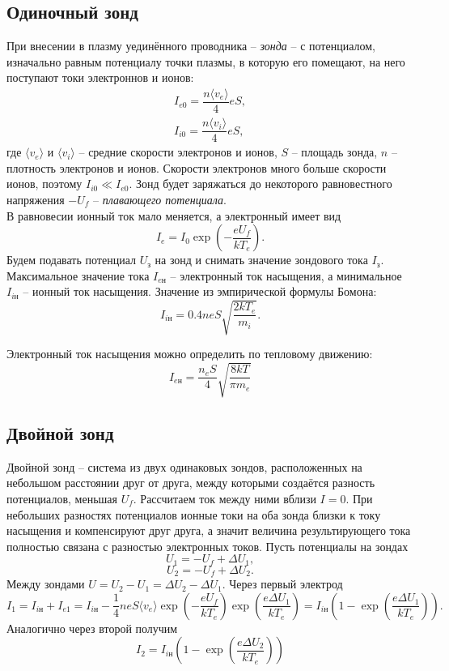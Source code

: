 \documentclass{lab}
\begin{document}
\subsection*{Одиночный зонд}
При внесении в плазму уединённого проводника -- \textit{зонда} -- с потенциалом, изначально равным потенциалу точки плазмы, в которую его помещают, на него поступают токи электроннов и ионов:
\begin{equation}
    \begin{array}{c}
        I_{e0} = \dfrac{n \langle v_e \rangle}{4}eS,\\
        I_{i0} = \dfrac{n \langle v_i \rangle}{4}eS,
    \end{array}
\end{equation}
где $\langle v_e \rangle$ и $\langle v_i \rangle$ -- средние скорости электронов и ионов, $S$ -- площадь зонда, $n$ -- плотность электронов и ионов. Скорости электронов много больше скорости ионов, поэтому $I_{i0} \ll I_{e0}$. Зонд будет заряжаться до некоторого равновестного напряжения $-U_f$ -- \textit{плавающего потенциала}.\\
В равновесии ионный ток мало меняется, а электронный имеет вид
$$
I_e = I_0 \exp\left( -\dfrac{eU_f}{kT_e} \right).
$$
Будем подавать потенциал $U_\text{з}$ на зонд и снимать значение зондового тока $I_\text{з}$. Максимальное значение тока $I_{e\text{н}}$ -- электронный ток насыщения, а минимальное $I_{i\text{н}}$ -- ионный ток насыщения. Значение из эмпирической формулы Бомона:
\begin{equation}
    I_{i\text{н}} = 0.4 neS \sqrt{\dfrac{2kT_e}{m_i}}.
\end{equation}

Электронный ток насыщения можно определить по тепловому движению:
\[I_{e\text{н}} = \frac{n_eS}{4}\sqrt{\frac{8kT}{\pi m_e}}\]
\subsection*{Двойной зонд}
Двойной зонд -- система из двух одинаковых зондов, расположенных на небольшом расстоянии друг от друга, между которыми создаётся разность потенциалов, меньшая $U_f$. Рассчитаем ток между ними вблизи $I=0$. При небольших разностях потенциалов ионные токи на оба зонда близки к току насыщения и компенсируют друг друга, а значит величина результирующего тока полностью связана с разностью электронных токов. Пусть потенциалы на зондах
$$
U_1 = -U_f + \Delta U_1,
$$
$$
U_2 = -U_f + \Delta U_2.
$$
Между зондами $U = U_2 - U_1 = \Delta U_2 - \Delta U_1$.
Через первый электрод
\begin{equation}
    I_1 = I_{i\text{н}} + I_{e1} = I_{i\text{н}} - \dfrac{1}{4}neS\langle v_e\rangle \exp\left(-\dfrac{eU_f}{kT_e}\right)\exp\left(\dfrac{e\Delta U_1}{kT_e}\right)=I_{i\text{н}}\left(1 - \exp\left( \dfrac{e\Delta U_1}{kT_e} \right)\right).
\end{equation}
Аналогично через второй получим
\begin{equation}
    I_2 = I_{i\text{н}}\left(1 - \exp\left( \dfrac{e\Delta U_2}{kT_e} \right)\right)
\end{equation}
\end{document}
